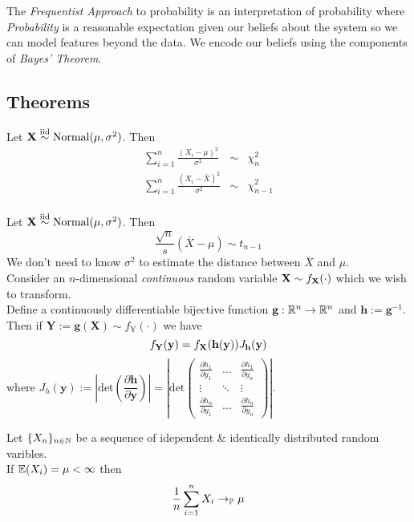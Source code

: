 \documentclass[11pt,a4paper]{article}
\begin{document}
The \textit{Frequentist Approach} to probability is an interpretation of probability where \textit{Probability} is a reasonable expectation given our beliefs about the system so we can model features beyond the data. We encode our beliefs using the components of \textit{Bayes' Theorem}.

\subsection{Theorems}

Let $\textbf{X}\overset{\text{iid}}{\sim}\text{Normal}(\mu,\sigma^2)$. Then
\[\begin{array}{rcl}
{\displaystyle\sum_{i=1}^n\frac{(X_i-\mu)^2}{\sigma^2}}&\sim&\chi^2_n\\
{\displaystyle\sum_{i=1}^n\frac{(X_i-\bar{X})^2}{\sigma^2}}&\sim&\chi^2_{n-1}\\
\end{array}\]

Let $\textbf{X}\overset{\text{iid}}{\sim}\text{Normal}(\mu,\sigma^2)$. Then
$$\frac{\sqrt{n}}{s}(\bar{X}-\mu)\sim t_{n-1}$$
\nb We don't need to know $\sigma^2$ to estimate the distance between $\bar{X}$ and $\mu$.\\

Consider an $n$-dimensional \textit{continuous} random variable $\textbf{X}\sim f_{\textbf{X}}(\cdot)$ which we wish to transform.\\
Define a continuously differentiable bijective function $\textbf{g}:\mathbb{R}^n\to\mathbb{R}^n$ and $\textbf{h}:=\textbf{g}^{-1}$.\\
Then if $\textbf{Y}:=\textbf{g}(\textbf{X})\sim f_\text{Y}(\cdot)$ we have
$$f_\textbf{Y}(\textbf{y})=f_{\textbf{X}}(\textbf{h}(\textbf{y}))J_\textbf{h}(\textbf{y})$$
where $J_h(\textbf{y}):=\left|\text{det}\left(\dfrac{\partial \textbf{h}}{\partial\textbf{y}}\right)\right|=\left|\text{det}\begin{pmatrix}\frac{\partial h_1}{\partial y_1}&\dots&\frac{\partial h_1}{\partial y_n}\\\vdots&\ddots&\vdots\\\frac{\partial h_n}{\partial y_1}&\dots&\frac{\partial h_n}{\partial y_n}\end{pmatrix}\right|$.

Let $\{X_n\}_{n\in\mathbb{N}}$ be a sequence of idependent \& identically distributed random varibles.\\
If $\mathbb{E}(X_i)=\mu<\infty$ then
$$\frac{1}{n}\sum_{i=1}^nX_i\to_{\mathbb{P}}\mu$$
\end{document}
